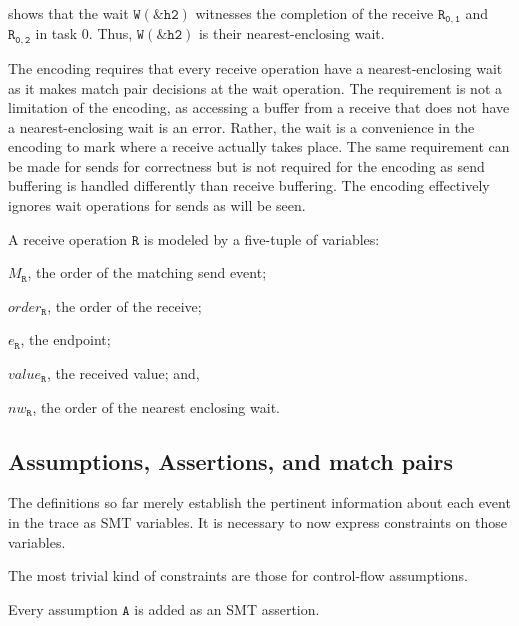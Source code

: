  shows that the wait $\mathtt{W{(\&h2)}}$
witnesses the completion of the receive $\mathtt{R_{0,1}}$ and
$\mathtt{R_{0,2}}$ in task 0. Thus, $\mathtt{W{(\&h2)}}$ is their
nearest-enclosing wait.

The encoding requires that every receive operation have a
nearest-enclosing wait as it makes match pair decisions at the wait
operation. The requirement is not a limitation of the encoding, as
accessing a buffer from a receive that does not have a
nearest-enclosing wait is an error. Rather, the wait is a convenience
in the encoding to mark where a receive actually takes place. The same
requirement can be made for sends for correctness but is not required
for the encoding as send buffering is handled differently than receive
buffering.  The encoding effectively ignores wait operations for sends
as will be seen.

\begin{definition}[Receive] \label{def:rcv}
A receive operation $\mathtt{R}$ is modeled by a five-tuple of variables:
\begin{compactenum}
\item $M_\mathtt{R}$, the order of the matching send event;

\item $\mathit{order}_\mathtt{R}$, the order of the receive;

\item $e_\mathtt{R}$, the endpoint;

\item $\mathit{value}_\mathtt{R}$, the received value; and,

\item $\mathit{nw}_\mathtt{R}$, the order of the nearest enclosing wait.
\end{compactenum}
\end{definition}

\subsection{Assumptions, Assertions, and match pairs}

The definitions so far merely establish the pertinent information
about each event in the trace as SMT variables. It is necessary to now express
constraints on those variables.

The most trivial kind of constraints are those for control-flow
assumptions.

\begin{definition}[Assumption] \label{def:assm}
Every assumption $\mathtt{A}$ is added as an SMT assertion.
\end{definition}

